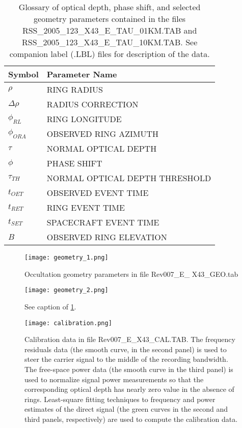 \documentclass[crop=false,class=book]{standalone}
\begin{document}
\begin{table}[H]
    \centering
    \begin{tabular}{l l}
        \hline
        Symbol			& Parameter Name \\
        \hline
        $\rho$			& RING RADIUS \\
        $\Delta\rho$		& RADIUS CORRECTION \\
        $\phi_{RL}$		& RING LONGITUDE \\
        $\phi_{ORA}$		& OBSERVED RING AZIMUTH \\
        $\tau$			& NORMAL OPTICAL DEPTH \\
        $\phi$			& PHASE SHIFT \\
        $\tau_{TH}$		& NORMAL OPTICAL DEPTH THRESHOLD \\
        $t_{OET}$			& OBSERVED EVENT TIME \\
        $t_{RET}$			& RING EVENT TIME \\
        $t_{SET}$			& SPACECRAFT EVENT TIME \\
        $B$				& OBSERVED RING ELEVATION \\
        \hline
    \end{tabular}
    \caption[Easy Data Parameters for Tau File]{Glossary of optical depth, phase shift, and selected geometry parameters contained in the files RSS\_2005\_123\_X43\_E\_TAU\_01KM.TAB and RSS\_2005\_123\_X43\_E\_TAU\_10KM.TAB. See companion label (.LBL) files for description of the data.}
\end{table}
\begin{figure}[H]
	    \centering
	        \texttt{[image: geometry\_1.png]}
	        \caption[Occultation Geometry]{Occultation geometry parameters in file Rev007\_E\_ X43\_GEO.tab}
	        \label{fig:easy_dqata_fig_occultation_geo_parameters_inf_file_rev007_E_X43_geo_tab}
\end{figure}
\begin{figure}[H]
	        \texttt{[image: geometry\_2.png]}
	        \caption[More Occultation Geometry]{See caption of \ref{fig:easy_dqata_fig_occultation_geo_parameters_inf_file_rev007_E_X43_geo_tab}.}
	\end{figure}
\begin{figure}[H]
    \centering
	    \texttt{[image: calibration.png]}
	    \caption[Calibration Data contained in the Easy Data]{Calibration data in file Rev007\_E\_X43\_CAL.TAB. The frequency residuals data (the smooth curve, in the second panel) is used to steer the carrier signal to the middle of the recording bandwidth. The free-space power data (the smooth curve in the third panel) is used to normalize signal power measurements so that the corresponding optical depth has nearly zero value in the absence of rings. Least-square fitting techniques to frequency and power estimates of the direct signal (the green curves in the second and third panels, respectively) are used to compute the calibration data.}
\end{figure}
\end{document}

